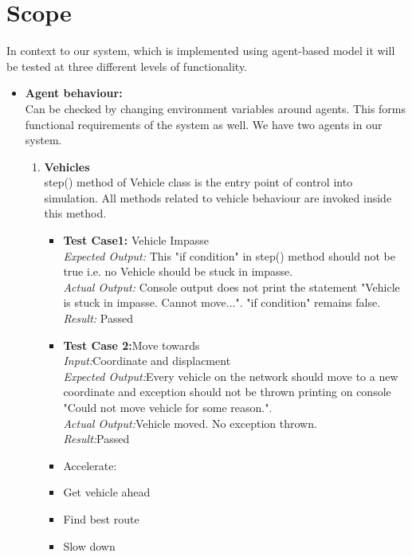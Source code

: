 \documentclass[11pt, oneside]{article}   	%
\begin{document}
\section{Scope}
In context to our system, which is implemented using agent-based model it will be tested at three different levels of functionality.
\begin{itemize}
\item \textbf{Agent behaviour: }\hfill \\
Can be checked by changing environment variables around agents.
This forms functional requirements of the system as well. We have two agents in our system. \begin{enumerate}
\item \textbf{Vehicles}\hfill \\
step() method of Vehicle class is the entry point of control into simulation. All methods related to vehicle behaviour are invoked inside this method.\hfill \\
\begin{itemize}
\item \textbf{Test Case1:} Vehicle Impasse\hfill \\
\textit{Expected Output: }This "if condition" in step() method should not be true i.e. no Vehicle should be stuck in impasse.\hfill \\
\textit{Actual Output:} Console output does not print the statement "Vehicle is stuck in impasse. Cannot move...". "if condition" remains false.\hfill \\
\textit{Result:} Passed\hfill \\

	\item \textbf{Test Case 2:}Move towards\hfill \\
	\textit{Input:}Coordinate and displacment\hfill \\
	\textit{Expected Output:}Every vehicle on the network should move to a new coordinate and exception should not be thrown printing on console "Could not move vehicle for some reason.".\hfill \\
	 \textit{Actual Output:}Vehicle moved. No exception thrown.\hfill \\
	 \textit{Result:}Passed
	\item Accelerate: 
	\item Get vehicle ahead
	\item Find best route
	\item Slow down
\end{itemize}


\end{enumerate}
\end{itemize}
\end{document}

